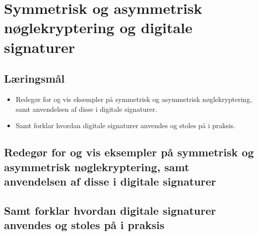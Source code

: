 \section{Symmetrisk og asymmetrisk nøglekryptering og digitale signaturer}

\subsection{Læringsmål}

\begin{itemize}
	\item Redegør for og vis eksempler på symmetrisk og asymmetrisk nøglekryptering, samt
	anvendelsen af disse i digitale signaturer.
	\item Samt forklar hvordan digitale signaturer anvendes og stoles på i praksis.
\end{itemize}

\subsection{Redegør for og vis eksempler på symmetrisk og asymmetrisk nøglekryptering, samt	anvendelsen af disse i digitale signaturer}
\subsection{Samt forklar hvordan digitale signaturer anvendes og stoles på i praksis}
